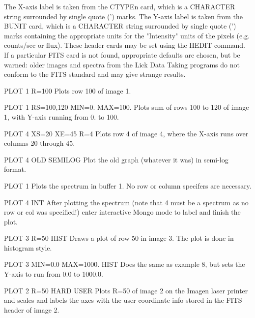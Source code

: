 The X-axis label is taken from the CTYPEn card, which is a CHARACTER string
surrounded by single quote (') marks.  The Y-axis label is taken from the
BUNIT card, which is a CHARACTER string surrounded by single quote (')
marks containing the appropriate units for the "Intensity" units of the
pixels (e.g. counts/sec or flux).  These header cards may be set using the
HEDIT command.  If a particular FITS card is not found, appropriate
defaults are chosen, but be warned: older images and spectra from the Lick
Data Taking programs do not conform to the FITS standard and may give
strange results.

\begin{example}
  \item[PLOT 1 R=100]{Plots row 100 of image 1.}
  \item[PLOT 1 RS=100,120 MIN=0. MAX=100.]{  Plots sum of rows 100 to
       120 of image 1, with Y-axis running from 0. to 100.}
  \item[PLOT 4 XS=20 XE=45 R=4]{Plots row 4 of image 4,
       where the X-axis runs over columns 20 through 45.}
  \item[PLOT 4 OLD SEMILOG]{Plot the old graph (whatever it was)
       in semi-log format.}
  \item[PLOT 1]{Plots the spectrum in buffer 1.  No
       row or column specifers are necessary.}
  \item[PLOT 4 INT ]{After plotting the spectrum (note that 4
       must be a spectrum as no row or col was
       specified!) enter interactive Mongo mode
       to label and finish the plot.}
  \item[PLOT 3 R=50 HIST]{Draws a plot of row 50 in image 3.
       The plot is d}one in histogram style.
  \item[PLOT 3 MIN=0.0 MAX=1000. HIST]{Does the same as example
       8, but sets the Y-axis to run from 0.0 to 1000.0.}
  \item[PLOT 2 R=50 HARD USER]{Plots R=50 of image 2 on the Imagen laser
       printer and scales and labels the axes with
       the user coordinate info stored in the FITS header of image 2.}
\end{example}

